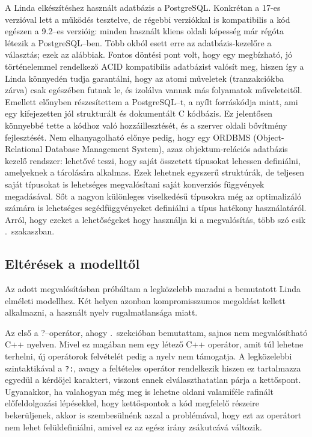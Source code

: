 A Linda \ts{} elkészítéshez használt adatbázis a PostgreSQL.
Konkrétan a 17-es verzióval lett a működés tesztelve, de régebbi verziókkal is kompatibilis a kód egészen a 9.2--es verzióig: minden használt kliens oldali képesség már régóta létezik a PostgreSQL--ben.
Több okból esett erre az adatbázis-kezelőre a választás; ezek az alábbiak.
Fontos döntési pont volt, hogy egy megbízható, jó történelemmel rendelkező ACID kompatibilis adatbázist valósít meg, hiszen így a Linda \ts{} könnyedén tudja garantálni, hogy az atomi műveletek (tranzakciókba zárva) csak egészében futnak le, és izolálva vannak más folyamatok műveleteitől.
Emellett előnyben részesítettem a PostgreSQL--t, a nyílt forráskódja miatt, ami egy kifejezetten jól strukturált és dokumentált C kódbázis.
Ez jelentősen könnyebbé tette a kódhoz való hozzáillesztését, és a szerver oldali bővítmény fejlesztését.
Nem elhanyagolható előnye pedig, hogy egy ORDBMS ({Object-Relational Database Management System}), azaz objektum-relációs adatbázis kezelő rendszer: lehetővé teszi, hogy saját összetett típusokat lehessen definiálni, amelyeknek a tárolására alkalmas.
Ezek lehetnek egyszerű struktúrák, de teljesen saját típusokat is lehetséges megvalósítani saját konverziós függvények megadásával.
Sőt a nagyon különleges viselkedésű típusokra még az optimalizáló számára is lehetséges segédfüggvényeket definiálni a típus hatékony használatáról.
Arról, hogy ezeket a lehetőségeket hogy használja ki a megvalósítás, több szó esik
.~szakaszban.

\subsection{Eltérések a modelltől}\label{subsec:diff-to-ideal}

Az adott megvalósításban próbáltam a legközelebb maradni a bemutatott Linda elméleti modellhez.
Két helyen azonban kompromisszumos megoldást kellett alkalmazni, a használt nyelv rugalmatlansága miatt.

Az első a ?--operátor, ahogy .~szekcióban bemutattam, sajnos nem megvalósítható C++ nyelven.
Mivel ez magában nem egy létező C++ operátor, amit túl lehetne terhelni, új operátorok felvételét pedig a nyelv nem támogatja.
A legközelebbi szintaktikával a \texttt{?:}, avagy a feltételes operátor rendelkezik hiszen ez tartalmazza egyedül a kérdőjel karaktert, viszont ennek elválaszthatatlan párja a kettőspont.
Ugyanakkor, ha valahogyan még meg is lehetne oldani valamiféle rafinált előfeldolgozási lépésekkel, hogy kettőspontok a kód megfelelő részeire bekerüljenek, akkor is szembesülnénk azzal a problémával, hogy ezt az operátort nem lehet felüldefiniálni, amivel ez az egész irány zsákutcává változik.

